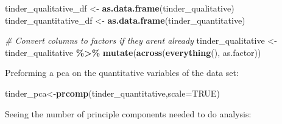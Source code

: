 \documentclass[
]{article}
\newenvironment{Shaded}{\begin{snugshade}}{\end{snugshade}}
\newcommand{\AttributeTok}[1]{\textcolor[rgb]{0.13,0.29,0.53}{#1}}
\newcommand{\CommentTok}[1]{\textcolor[rgb]{0.56,0.35,0.01}{\textit{#1}}}
\newcommand{\ConstantTok}[1]{\textcolor[rgb]{0.56,0.35,0.01}{#1}}
\newcommand{\DecValTok}[1]{\textcolor[rgb]{0.00,0.00,0.81}{#1}}
\newcommand{\FunctionTok}[1]{\textcolor[rgb]{0.13,0.29,0.53}{\textbf{#1}}}
\newcommand{\NormalTok}[1]{#1}
\newcommand{\OtherTok}[1]{\textcolor[rgb]{0.56,0.35,0.01}{#1}}
\newcommand{\SpecialCharTok}[1]{\textcolor[rgb]{0.81,0.36,0.00}{\textbf{#1}}}
\newcommand{\StringTok}[1]{\textcolor[rgb]{0.31,0.60,0.02}{#1}}
\begin{document}
\begin{Shaded}
\begin{Highlighting}[]
\NormalTok{tinder\_qualitative\_df }\OtherTok{\textless{}{-}} \FunctionTok{as.data.frame}\NormalTok{(tinder\_qualitative)}
\NormalTok{tinder\_quantitative\_df }\OtherTok{\textless{}{-}} \FunctionTok{as.data.frame}\NormalTok{(tinder\_quantitative)}
\end{Highlighting}
\end{Shaded}

\begin{Shaded}
\begin{Highlighting}[]
\CommentTok{\# Convert columns to factors if they aren\textquotesingle{}t already}
\NormalTok{tinder\_qualitative }\OtherTok{\textless{}{-}}\NormalTok{ tinder\_qualitative }\SpecialCharTok{\%\textgreater{}\%}
  \FunctionTok{mutate}\NormalTok{(}\FunctionTok{across}\NormalTok{(}\FunctionTok{everything}\NormalTok{(), as.factor))}
\end{Highlighting}
\end{Shaded}

Preforming a pca on the quantitative variables of the data set:

\begin{Shaded}
\begin{Highlighting}[]
\NormalTok{tinder\_pca}\OtherTok{\textless{}{-}}\FunctionTok{prcomp}\NormalTok{(tinder\_quantitative,}\AttributeTok{scale=}\ConstantTok{TRUE}\NormalTok{)}
\end{Highlighting}
\end{Shaded}

Seeing the number of principle components needed to do analysis:

\begin{Shaded}
\end{Shaded}
\end{document}

